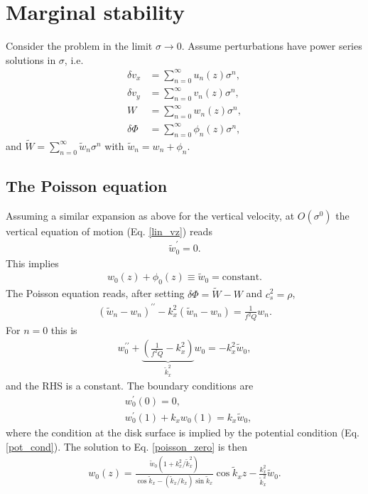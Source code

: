 \documentclass[12pt,preprint]{aastex}
\newcommand{\dd}{\delta}
\newcommand{\dvx}{\dd v_x}
\newcommand{\dvy}{\dd v_y}
\newcommand{\w}{ \widetilde{W}}
\newcommand{\dphi}{\dd \Phi}
\begin{document}
\section{Marginal stability} 
Consider the problem in the limit $\sigma \to 0$. Assume perturbations
have power series solutions in $\sigma$, i.e. 
\begin{align}
  \dvx &= \sum_{n=0}^\infty u_n(z)\sigma^n,\\
  \dvy &= \sum_{n=0}^\infty v_n(z)\sigma^n,\\
  W    &= \sum_{n=0}^\infty w_n(z)\sigma^n,\\
  \dphi&= \sum_{n=0}^\infty \phi_n(z)\sigma^n, 
\end{align}
and $\w = \sum_{n=0}^\infty \tilde{w}_n \sigma^n$ with $\tilde{w}_n =
w_n + \phi_n$. 

\subsection{The Poisson equation} 
Assuming a similar expansion as above for the vertical velocity, at
$O(\sigma^0)$ the vertical equation of motion (Eq. \ref{lin_vz}) reads
\begin{align}
  \tilde{w}^\prime_0 = 0. 
\end{align}
This implies
\begin{align}
  w_0(z) + \phi_0(z) \equiv \tilde{w} _0 = \mathrm{constant}. 
\end{align}
The Poisson equation reads, after setting $\dphi = \w - W$ and
$c_s^2=\rho$, 
\begin{align}
  \left(\tilde{w}_n-w_n\right)^{\prime\prime} - k_x^2\left(\tilde{w}_n - w_n\right) =
  \frac{1}{f^2Q} w_n. 
\end{align}
For $n=0$ this is
\begin{align}
  w_0^{\prime\prime} + \underbrace{\left(\frac{1}{f^2Q} -
    k_x^2\right)}_{\tilde{k}_x^2}w_0 = -k_x^2 \tilde{w}_0, 
\end{align}
and the RHS is a constant. The boundary conditions are 
\begin{align}
  &w_0^\prime(0) = 0,\\
  &w_0^\prime(1) + k_x w_0(1) = k_x \tilde{w}_0, \label{poisson_zero}
\end{align} 
where the condition at the disk surface is implied by the potential
condition (Eq. \ref{pot_cond}). The solution to Eq. \ref{poisson_zero}
is then
\begin{align}
  w_0(z) = \frac{\tilde{w}_0\left(1 +
    k_x^2/\tilde{k}_x^2\right)}{\cos{\tilde{k}_x} -
    \left(\tilde{k}_x/k_x\right)\sin{\tilde{k}_x}}\cos{\tilde{k}_xz} -
  \frac{k_x^2}{\tilde{k}_x^2}\tilde{w}_0. \label{w0_sol}  
\end{align}
\end{document}
